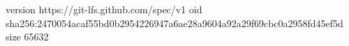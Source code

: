 version https://git-lfs.github.com/spec/v1
oid sha256:2470054acaf55bd0b2954226947a6ae28a9604a92a29f69cbc0a2958fd45ef5d
size 65632
